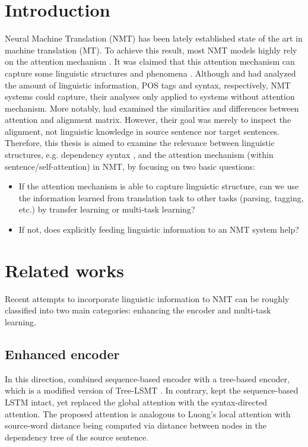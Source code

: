 \documentclass{article}
\begin{document}
\section{Introduction}
Neural Machine Translation (NMT) has been lately established state of the art in machine translation (MT). To achieve this result, most NMT models highly rely on the attention mechanism \citep{bahdanau:etal:attention:iclr:2015}. It was claimed that this attention mechanism can capture some linguistic structures and phenomena \citep{DBLP:conf/nips/VaswaniSPUJGKP17}. Although \cite{DBLP:conf/acl/BelinkovDDSG17} and \cite{DBLP:conf/emnlp/ShiPK16} had analyzed the amount of linguistic information, POS tags and syntax, respectively, NMT systems could capture, their analyses only applied to systems without attention mechanism. More notably, \cite{DBLP:conf/ijcnlp/GhaderM17} had examined the similarities and differences between attention and alignment matrix. However, their goal was merely to inspect the alignment, not linguistic knowledge in source sentence nor target sentences. Therefore, this thesis is aimed to examine the relevance between linguistic structures, e.g. dependency syntax \citep{melvcuk1988dependency}, and the attention mechanism (within sentence/self-attention) in NMT, by focusing on two basic questions:
\begin{itemize}
    \item If the attention mechanism is able to capture linguistic structure, can we use the information learned from translation task to other tasks (parsing, tagging, etc.) by transfer learning or multi-task learning?
    \item If not, does explicitly feeding linguistic information to an NMT system help?
\end{itemize}

\section{Related works}

Recent attempts to incorporate linguistic information to NMT can be roughly classified into two main categories: enhancing the encoder and multi-task learning.

\subsection{Enhanced encoder}
In this direction, \cite{DBLP:conf/acl/EriguchiHT16} combined sequence-based encoder with a tree-based encoder, which is a modified version of Tree-LSMT \citep{DBLP:conf/acl/TaiSM15}. In contrary, \cite{DBLP:journals/corr/abs-1711-04231} kept the sequence-based LSTM intact, yet replaced the global attention \citep{DBLP:conf/emnlp/LuongPM15} with the syntax-directed attention. The proposed attention is analogous to Luong's local attention with source-word distance being computed via distance between nodes in the dependency tree of the source sentence.
\end{document}

